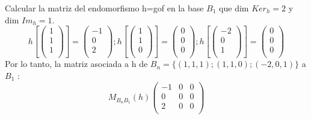 \documentclass[11pt]{article}
\begin{document}
\begin{question}
\begin{subquestion}{Calcular la matriz del endomorfismo h=gof en la base $B_{1}$}
{        \newline 
        que dim $Ker_{h} = 2$ y dim $Im_{h}= 1$.
        \begin{equation*}
            h\left[\displaystyle\begin{pmatrix}
                1\\
                1\\
                1\\
        \end{pmatrix}\right] = \begin{pmatrix}
                -1\\
                0\\
                2\\
        \end{pmatrix}; 
        h\left[\begin{pmatrix}
                1\\
                1\\
                0\\
        \end{pmatrix}\right] = \begin{pmatrix}
                0\\
                0\\
                0\\
        \end{pmatrix};
        h\left[\begin{pmatrix}
                -2\\
                0\\
                1\\
        \end{pmatrix}\right] = \begin{pmatrix}
                0\\
                0\\
                0\\
        \end{pmatrix}
        \end{equation*}
        Por lo tanto, la matriz asociada a h de $B_{n}=\{(1,1,1);(1,1,0);(-2,0,1)\}$ a $B_{1}$ :
        \begin{equation*}
            M_{B_{n}B_{1}}(h)\begin{pmatrix}
                -1  &   0   &   0\\
                0  &   0   &   0\\
                2  &   0   &   0\\
            \end{pmatrix}

\end{equation*}}
\end{subquestion}
\end{question}
\end{document}

